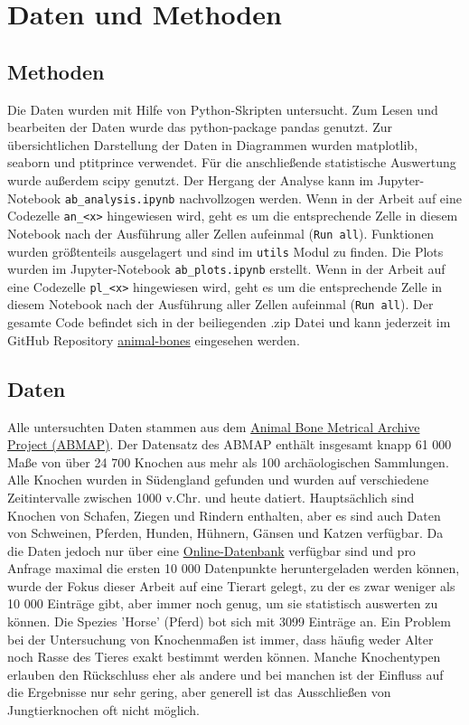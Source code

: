 \section{Daten und Methoden}

\subsection{Methoden}
Die Daten wurden mit Hilfe von Python\cite{pythonPY}-Skripten untersucht. 
Zum Lesen und bearbeiten der Daten wurde das python-package pandas\cite{pandasPY} genutzt. Zur übersichtlichen Darstellung der Daten in Diagrammen wurden matplotlib\cite{matplotlibPY}, seaborn\cite{matplotlibPY} und ptitprince\cite{ptitprincePY} verwendet. 
Für die anschließende statistische Auswertung wurde außerdem
scipy\cite{scipyPY} genutzt.
Der Hergang der Analyse kann im Jupyter-Notebook \texttt{ab\_analysis.ipynb} nachvollzogen werden. 
Wenn in der Arbeit auf eine Codezelle \texttt{an\_<x>} hingewiesen wird, geht es um die entsprechende Zelle in diesem Notebook nach der Ausführung aller Zellen aufeinmal (\texttt{Run all}).
Funktionen wurden größtenteils ausgelagert und sind im \texttt{utils} Modul zu finden. 
Die Plots wurden im Jupyter-Notebook \texttt{ab\_plots.ipynb} erstellt.
Wenn in der Arbeit auf eine Codezelle \texttt{pl\_<x>} hingewiesen wird, geht es um die entsprechende Zelle in diesem Notebook nach der Ausführung aller Zellen aufeinmal (\texttt{Run all}).
Der gesamte Code befindet sich in der beiliegenden .zip Datei und kann jederzeit im GitHub Repository \href{https://github.com/Graunarmin/animal-bones}{animal-bones} eingesehen werden.

\subsection{Daten}
Alle untersuchten Daten stammen aus dem \href{https://archaeologydataservice.ac.uk/archives/view/abmap/}{Animal Bone Metrical Archive Project (ABMAP)}.
Der Datensatz des ABMAP enthält insgesamt knapp 61 000 Maße von über 24 700 Knochen aus mehr als 100 archäologischen Sammlungen.
Alle Knochen wurden in Südengland gefunden und wurden auf verschiedene Zeitintervalle zwischen 1000 v.Chr. und heute datiert. 
Hauptsächlich sind Knochen von Schafen, Ziegen und Rindern enthalten, aber es sind auch Daten von Schweinen, Pferden, Hunden, Hühnern, Gänsen und Katzen verfügbar. 
Da die Daten jedoch nur über eine \href{https://archaeologydataservice.ac.uk/archives/view/abmap/search.cfm}{Online-Datenbank} verfügbar sind und pro Anfrage maximal die ersten 10 000 Datenpunkte heruntergeladen werden können, wurde der Fokus dieser Arbeit auf eine Tierart gelegt, zu der es zwar weniger als 10 000 Einträge gibt, aber immer noch genug, um sie statistisch auswerten zu können. 
Die Spezies 'Horse' (Pferd) bot sich mit 3099 Einträge an.
Ein Problem bei der Untersuchung von Knochenmaßen ist immer, dass häufig weder Alter noch Rasse des Tieres exakt bestimmt werden können. Manche Knochentypen erlauben den Rückschluss eher als andere und bei manchen ist der Einfluss auf die Ergebnisse nur sehr gering, aber generell ist das Ausschließen von Jungtierknochen oft nicht möglich\cite{Levine1981}.

